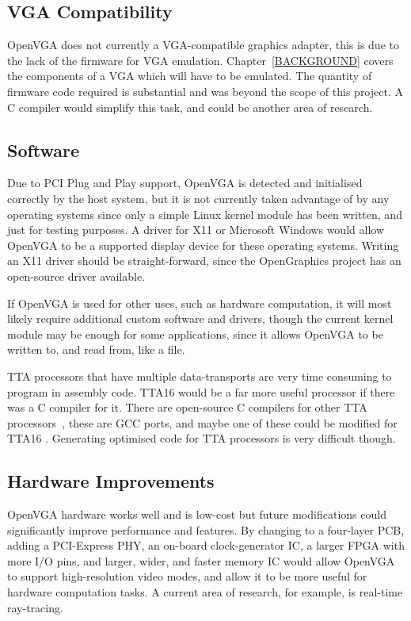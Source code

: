 \subsection{VGA Compatibility}
OpenVGA does not currently a VGA-compatible graphics adapter, this is due to the
lack of the firmware for VGA emulation. Chapter~\ref{BACKGROUND} covers the
components of a VGA which will have to be emulated. The quantity of firmware code
required is substantial and was beyond the scope of this project. A C compiler
would simplify this task, and could be another area of research.


\subsection{Software}
Due to PCI Plug and Play support, OpenVGA is detected and initialised correctly
by the host system, but it is not currently taken advantage of by any operating
systems since only a simple Linux kernel module has been written, and just for
testing purposes. A driver for X11 or Microsoft Windows would allow OpenVGA to be
a supported display device for these operating systems. Writing an X11 driver
should be straight-forward, since the OpenGraphics project has an open-source
driver available.

If OpenVGA is used for other uses, such as hardware computation, it will most
likely require additional custom software and drivers, though the current kernel
module may be enough for some applications, since it allows OpenVGA to be written
to, and read from, like a file.

TTA processors that have multiple data-transports are very time consuming to
program in assembly code. TTA16 would be a far more useful processor if there
was a C compiler for it. There are open-source C compilers for other TTA
processors~\cite{jaaskelainen2007cta, corporaal1993maa}, these are GCC ports,
and maybe one of these could be modified for TTA16 . Generating optimised
code for TTA processors is very difficult though.


\subsection{Hardware Improvements}
OpenVGA hardware works well and is low-cost but future modifications could
significantly improve performance and features. By changing to a four-layer PCB,
adding a PCI-Express PHY, an on-board clock-generator IC, a larger FPGA with more
I/O pins, and larger, wider, and faster memory IC would allow OpenVGA to support
high-resolution video modes, and allow it to be more useful for hardware
computation tasks. A current area of research, for example, is real-time
ray-tracing\cite{wald2004rrt, TTA_Ray_Trace}.

